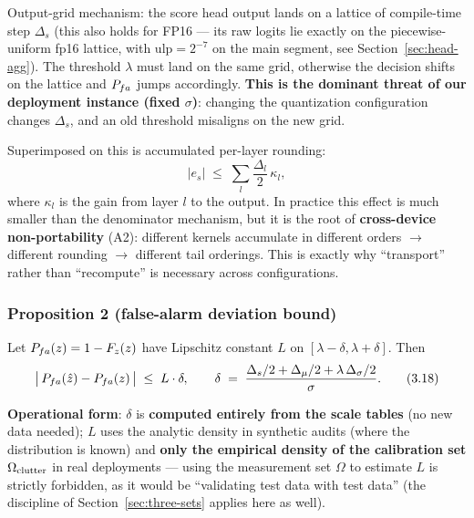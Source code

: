 Output-grid mechanism: the score head output lands on a lattice of compile-time step $\Delta_s$ (this also holds for FP16 --- its raw logits lie exactly on the piecewise-uniform fp16 lattice, with $\mathrm{ulp}=2^{-7}$ on the main segment, see Section~\ref{sec:head-agg}).
The threshold $\lambda$ must land on the same grid, otherwise the decision shifts on the lattice and $P_{fa}$ jumps accordingly.
\textbf{This is the dominant threat of our deployment instance (fixed $\sigma$)}: changing the quantization configuration changes $\Delta_s$, and an old threshold misaligns on the new grid.

Superimposed on this is accumulated per-layer rounding:
\begin{equation}
|e_s| \;\le\; \sum_{l}\frac{\Delta_l}{2}\,\kappa_l,
\label{eq:rounding}
\end{equation}
where $\kappa_l$ is the gain from layer $l$ to the output.
In practice this effect is much smaller than the denominator mechanism, but it is the root of \textbf{cross-device non-portability} (A2): different kernels accumulate in different orders $\to$ different rounding $\to$ different tail orderings.
This is exactly why ``transport'' rather than ``recompute'' is necessary across configurations.

\subsubsection{Proposition 2 (false-alarm deviation bound)}
\label{sec:prop2}

\begin{proposition}
\label{prop:bound}
Let $P_{fa}(z)=1-F_z(z)$ have Lipschitz constant $L$ on $[\lambda-\delta,\lambda+\delta]$. Then
\begin{equation}
\big|\,P_{fa}(\hat z)-P_{fa}(z)\,\big| \;\le\; L\cdot\delta,
\qquad
\delta \;=\; \frac{\Delta_s/2+\Delta_\mu/2+\lambda\,\Delta_\sigma/2}{\sigma}.
\tag{3.18}
\label{eq:bound}
\end{equation}
\end{proposition}

\textbf{Operational form}: $\delta$ is \textbf{computed entirely from the scale tables} (no new data needed); $L$ uses the analytic density in synthetic audits (where the distribution is known) and \textbf{only the empirical density of the calibration set $\Omega_{\mathrm{clutter}}$} in real deployments --- using the measurement set $\Omega$ to estimate $L$ is strictly forbidden, as it would be ``validating test data with test data'' (the discipline of Section~\ref{sec:three-sets} applies here as well).

